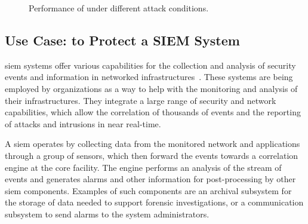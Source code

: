\begin{figure}[h]
\caption{\small Performance of \sieveq under different attack conditions.}
\label{fig:performance_attacks}
\end{figure}

\subsection{Use Case: \sieveq to Protect a SIEM System}
\label{use_case}

\gls{siem} systems offer various capabilities for the collection and analysis of security events and information in networked infrastructures~\cite{Miller:2010}.
These systems are being employed by organizations as a way to help with the monitoring and analysis of their infrastructures.
They integrate a large range of security and network capabilities, which allow the correlation of thousands of events and the reporting of attacks and intrusions in near real-time.

A \gls{siem} operates by collecting data from the monitored network and applications through a group of sensors, which then forward the events towards a correlation engine at the core facility.
The engine performs an analysis of the stream of events and generates alarms and other information for post-processing by other \gls{siem} components.
Examples of such components are an archival subsystem for the storage of data needed to support forensic investigations, or a communication subsystem to send alarms to the system administrators.

